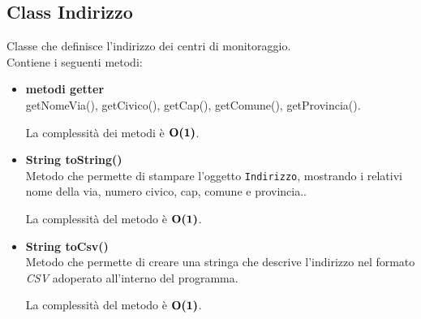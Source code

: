 \documentclass[a4paper, 12pt]{scrreprt}
\begin{document}
			\subsection{Class Indirizzo}
			Classe che definisce l'indirizzo dei centri di monitoraggio.
			\\Contiene i seguenti metodi:\\
			\begin{itemize}
				\item \textbf{metodi getter}
				\\ getNomeVia(), getCivico(), getCap(), getComune(), getProvincia().

				La complessit\`a dei metodi \`e $\mathbf{O}\textbf{(1)}$.

				\item \textbf{String toString()}
				\\Metodo che permette di stampare l'oggetto \verb!Indirizzo!, mostrando i relativi nome della via, numero civico, cap, comune e provincia..

				La complessit\`a del metodo \`e $\mathbf{O}\textbf{(1)}$.

				\item \textbf{String toCsv()}
				\\Metodo che permette di creare una stringa che descrive l'indirizzo nel formato \textsl{CSV} adoperato all'interno del programma.

				La complessit\`a del metodo \`e $\mathbf{O}\textbf{(1)}$.

			\end{itemize}
\pagebreak
\end{document}
